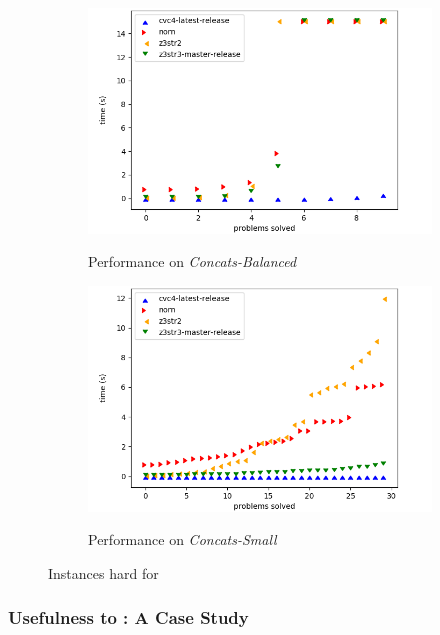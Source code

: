\begin{figure}[h]
    \vspace{0.15in}

    \begin{subfigure}{.5\textwidth}
        \includegraphics[width=\textwidth]{data/graphs/concats-balanced.png}
        \label{fig:concats-balanced}
        \caption{Performance on \textit{Concats-Balanced}}
    \end{subfigure}
    \begin{subfigure}{.5\textwidth}
        \includegraphics[width=\textwidth]{data/graphs/concats-small.png}
        \label{fig:concats-small}
        \caption{Performance on \textit{Concats-Small}}
    \end{subfigure}
    \caption{Instances hard for \us{}}
    \label{fig:z3str3-hard}
\end{figure}

\subsubsection{Usefulness to \us{}: A Case Study}

